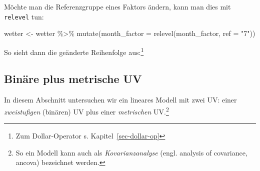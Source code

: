 \documentclass[
  letterpaper,
]{scrbook}
\newenvironment{Shaded}{\begin{snugshade}}{\end{snugshade}}
\newcommand{\AttributeTok}[1]{\textcolor[rgb]{0.40,0.45,0.13}{#1}}
\newcommand{\DocumentationTok}[1]{\textcolor[rgb]{0.37,0.37,0.37}{\textit{#1}}}
\newcommand{\FunctionTok}[1]{\textcolor[rgb]{0.28,0.35,0.67}{#1}}
\newcommand{\NormalTok}[1]{\textcolor[rgb]{0.00,0.23,0.31}{#1}}
\newcommand{\OtherTok}[1]{\textcolor[rgb]{0.00,0.23,0.31}{#1}}
\newcommand{\SpecialCharTok}[1]{\textcolor[rgb]{0.37,0.37,0.37}{#1}}
\newcommand{\StringTok}[1]{\textcolor[rgb]{0.13,0.47,0.30}{#1}}
\theoremstyle{definition}
\theoremstyle{definition}
\theoremstyle{definition}
\theoremstyle{remark}
\begin{document}
Möchte man die Referenzgruppe eines Faktors ändern, kann man dies mit
\texttt{relevel} tun:

\begin{Shaded}
\begin{Highlighting}[]
\NormalTok{wetter }\OtherTok{\textless{}{-}}
\NormalTok{  wetter }\SpecialCharTok{\%\textgreater{}\%} 
  \FunctionTok{mutate}\NormalTok{(}\AttributeTok{month\_factor =} \FunctionTok{relevel}\NormalTok{(month\_factor, }\AttributeTok{ref =} \StringTok{"7"}\NormalTok{))}
\end{Highlighting}
\end{Shaded}

So sieht dann die geänderte Reihenfolge aus:\footnote{Zum
  Dollar-Operator s. Kapitel~\ref{sec-dollar-op}}

\begin{Shaded}
\end{Shaded}

\subsection{Binäre plus metrische UV}\label{sec-faktorvar}

In diesem Abschnitt untersuchen wir ein lineares Modell mit zwei UV:
einer \emph{zweistufigen} (binären) UV plus einer \emph{metrischen}
UV.\footnote{So ein Modell kann auch als \emph{Kovarianzanalyse} (engl.
  analysis of covariance, ancova) bezeichnet werden.}
\end{document}
